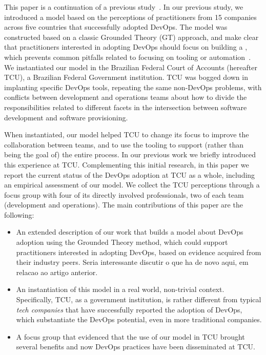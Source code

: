 This paper is a continuation of a previous study~\cite{Luz:2018:ESEM}.
In our previous study, we introduced a model based on the perceptions of practitioners from
15 companies across five countries that successfully adopted DevOps. The model
was constructed based on a classic Grounded Theory (GT) approach,
and make clear that practitioners interested in adopting DevOps should focus on building a
\cc, which prevents common pitfalls related to focusing on tooling or automation~\cite{Kromhout:2017:Queue}.
We instantiated our model in the Brazilian Federal Court of
Accounts (hereafter TCU), a Brazilian Federal Government institution. TCU was
bogged down in implanting specific DevOps tools, repeating the same non-DevOps
problems, with conflicts between development and operations teams about how to
divide the responsibilities related to different facets in the intersection
between software development and software provisioning.

When instantiated,
our model helped TCU to change its focus to improve the collaboration between teams, and to use the tooling
to support (rather than being the goal of) the entire process.
{\color{blue}In our previous work
we briefly introduced this experience at TCU.}
Complementing this initial research, in this paper we report the current status 
of the DevOps adoption at TCU as a whole, including an empirical assessment of our model.
We collect the TCU perceptions through a focus group with four of its directly
involved professionals, two of each team (development and operations).
The main contributions of this paper are the following:

\begin{itemize}
\item An extended description of our work that builds a model about DevOps
  adoption using the Grounded Theory method, which could support practitioners interested in adopting DevOps,
  based on evidence acquired from their industry peers. {\color{red}Seria interessante discutir o que
  ha de novo aqui, em relacao ao artigo anterior.}
\item An instantiation of this model in a real world, non-trivial context. Specifically, TCU, as a government institution, is rather different from typical \emph{tech companies} that have successfully reported the adoption of DevOps, which substantiate the DevOps potential, even in more traditional companies.
\item A focus group that evidenced that the use of our model in TCU brought several benefits and
now DevOps practices have been disseminated at TCU.
\end{itemize}
